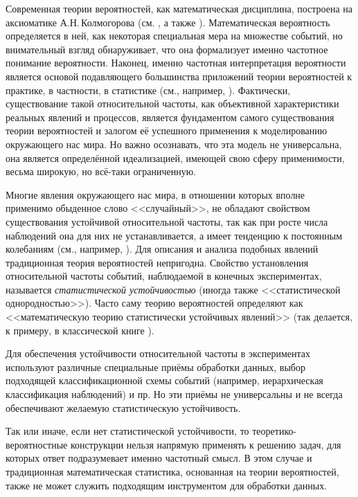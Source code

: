\documentclass[a5paper,openany]{book}
\begin{document}
Современная теории вероятностей, как математическая дисциплина, построена на 
аксиоматике А.Н.\,Колмогорова (см. \cite{Kolmogorov}, а также \cite{Gnedenko,HCramer}). 
Математическая вероятность определяется в ней, как некоторая специальная мера 
на множестве событий, но внимательный взгляд обнаруживает, что она формализует именно 
частотное понимание вероятности. Наконец, именно частотная интерпретация вероятности 
является основой подавляющего большинства приложений теории вероятностей к практике, 
в частности, в статистике (см., например, \cite{vonMises, Tutubalin1972, Tutubalin2008, 
Eliasberg83}). Фактически, существование такой относительной частоты, как объективной 
характеристики реальных явлений и процессов, является фундаментом самого существования 
теории вероятностей и залогом её успешного применения к моделированию окружающего нас 
мира. Но важно осознавать, что эта модель не универсальна, она является определённой 
идеализацией, имеющей свою сферу применимости, весьма широкую, но всё-таки 
ограниченную. 
  
Многие явления окружающего нас мира, в отношении которых вполне применимо обыденное 
слово <<случайный>>, не обладают свойством существования устойчивой относительной 
частоты, так как при росте числа наблюдений она для них не устанавливается, а имеет 
тенденцию к постоянным колебаниям (см., например, \cite{GorbanBook, GorbanPaper}). 
Для описания и анализа подобных явлений традиционная теория вероятностей непригодна. 
Свойство установления относительной частоты событий, наблюдаемой в конечных 
экспериментах, называется \emph{статистической устойчивостью} (иногда также 
<<статистической однородностью>>). Часто саму теорию вероятностей определяют как 
<<математическую теорию статистически устойчивых явлений>> (так делается, к примеру, 
в классической книге \cite{HCramer}).   
  
Для обеспечения устойчивости относительной частоты в экспериментах используют различные 
специальные приёмы обработки данных, выбор подходящей классификационной схемы событий 
(например, иерархическая классификация наблюдений) и пр. Но эти приёмы не универсальны 
и не всегда обеспечивают желаемую статистическую устойчивость. 
    
Так или иначе, если нет статистической устойчивости, то теоретико-вероятностные 
конструкции нельзя напрямую применять к решению задач, для которых ответ подразумевает 
именно частотный смысл. В этом случае и традиционная математическая статистика, 
основанная на теории вероятностей, также не может служить подходящим инструментом 
для обработки данных.   
  
\end{document}
